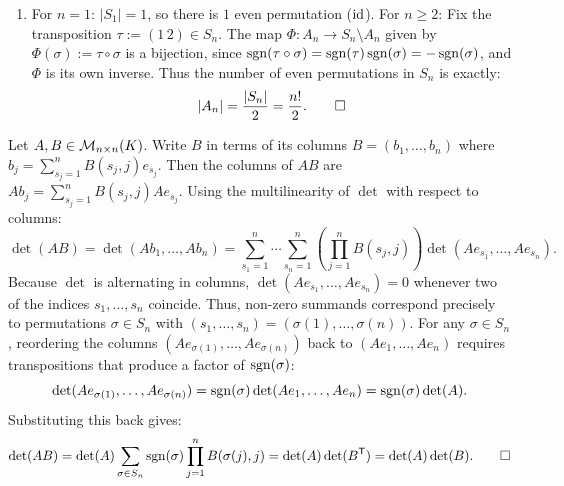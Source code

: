 \begin{exercisesolution*}
\begin{enumerate}[label=\textbf{(\alph*)}]
    \item For $n = 1$: $|S_1| = 1$, so there is $1$ even permutation ($\operatorname{id}$).
    For $n \ge 2$: Fix the transposition $\tau := (1\,2) \in S_n$.
    The map $\Phi \colon A_n \to S_n \setminus A_n$ given by $\Phi(\sigma) := \tau \circ \sigma$ is a bijection, since $\operatorname{sgn}(\tau \circ \sigma) = \operatorname{sgn}(\tau) \operatorname{sgn}(\sigma) = -\operatorname{sgn}(\sigma)$, and $\Phi$ is its own inverse.
    Thus the number of even permutations in $S_n$ is exactly:
    \[
    |A_n| = \frac{|S_n|}{2} = \frac{n!}{2}. \qedhere
    \]
\end{enumerate}
\end{exercisesolution*}

\begin{exercisesolution}
\label{sol:multiplicativity_via_leibniz}
Let $A, B \in \mathcal{M}_{n \times n}(K)$. Write $B$ in terms of its columns $B = (b_1, \dots, b_n)$ where $b_j = \sum_{s_j=1}^n B(s_j, j) e_{s_j}$.
Then the columns of $AB$ are $A b_j = \sum_{s_j=1}^n B(s_j, j) A e_{s_j}$.
Using the multilinearity of $\det$ with respect to columns:
\[
\det(AB) = \det(A b_1, \dots, A b_n) = \sum_{s_1=1}^n \cdots \sum_{s_n=1}^n \left(\prod_{j=1}^n B(s_j, j)\right) \det(A e_{s_1}, \dots, A e_{s_n}).
\]
Because $\det$ is alternating in columns, $\det(A e_{s_1}, \dots, A e_{s_n}) = 0$ whenever two of the indices $s_1, \dots, s_n$ coincide.
Thus, non-zero summands correspond precisely to permutations $\sigma \in S_n$ with $(s_1, \dots, s_n) = (\sigma(1), \dots, \sigma(n))$.
For any $\sigma \in S_n$, reordering the columns $(A e_{\sigma(1)}, \dots, A e_{\sigma(n)})$ back to $(A e_1, \dots, A e_n)$ requires transpositions that produce a factor of $\operatorname{sgn}(\sigma)$:
\[
\det(A e_{\sigma(1)}, \dots, A e_{\sigma(n)}) = \operatorname{sgn}(\sigma) \det(A e_1, \dots, A e_n) = \operatorname{sgn}(\sigma) \det(A).
\]
Substituting this back gives:
\[
\det(AB) = \det(A) \sum_{\sigma \in S_n} \operatorname{sgn}(\sigma) \prod_{j=1}^n B(\sigma(j), j) = \det(A) \det(B^{\mathsf{T}}) = \det(A) \det(B). \qedhere
\]
\end{exercisesolution}

